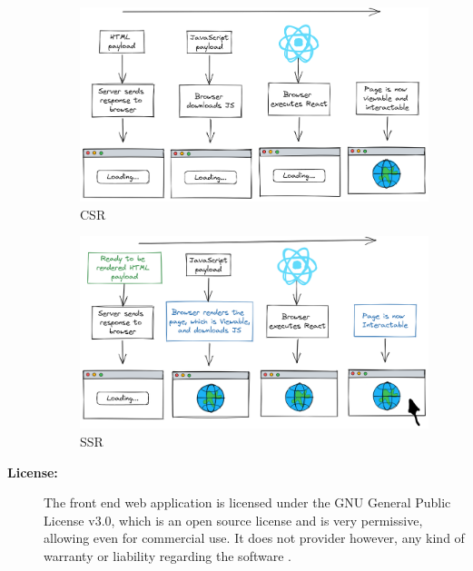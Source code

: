 \begin{description}
    \begin{figure}[!htb]
      \caption{\acl{CSR}}\label{fig:csr}
      \begin{center}
        \includegraphics[width=14cm]{img/6-csr.png}
      \end{center}
    \end{figure}

    \begin{figure}[!htb]
      \caption{\acl{SSR}}\label{fig:ssr}
      \begin{center}
        \includegraphics[width=14cm]{img/6-ssr.png}
      \end{center}
    \end{figure}
  \item[\textbf{License:}] The front end web application is licensed under the GNU General Public License v3.0, which is an open source license and is very permissive, allowing even for commercial use. It does not provider however, any kind of warranty or liability regarding the software \cite{gnugpl3}.

\end{description}

